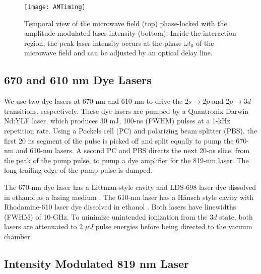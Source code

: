 \documentclass[aps,pra,reprint,groupedaddress]{revtex4-1}
\begin{document}
\begin{figure}
	\texttt{[image: AMTiming]}
	\caption{Temporal view of the microwave field (top) phase-locked with the amplitude modulated laser intensity (bottom). Inside the interaction region, the peak laser intensity occurs at the phase $\omega t_0$ of the microwave field and can be adjusted by an optical delay line.}
	\label{fig:AMLaser}
\end{figure}

\subsection{\label{sec:dye} 670 and 610 nm Dye Lasers}

We use two dye lasers at 670-nm and 610-nm to drive the $2s \rightarrow 2p$ and $2p \rightarrow 3d$ transitions, respectively. These dye lasers are pumped by a Quantronix Darwin Nd:YLF laser, which produces 30 mJ, 100-ns (FWHM) pulses at a 1-kHz repetition rate. Using a Pockels cell (PC) and polarizing beam splitter (PBS), the first 20 ns segment of the pulse is picked off and split equally to pump the 670-nm and 610-nm lasers. A second PC and PBS directs the next 20-ns slice, from the peak of the pump pulse, to pump a dye amplifier for the 819-nm laser. The long trailing edge of the pump pulse is dumped.

The 670-nm dye laser has a Littman-style cavity and LDS-698 laser dye dissolved in ethanol as a lasing medium \cite{Littman}. The 610-nm laser has a H{\"a}nsch style cavity with Rhodamine-610 laser dye dissolved in ethanol \cite{Hansch}. Both lasers have linewidths (FWHM) of 10-GHz. To minimize unintended ionization from the $3d$ state, both lasers are attenuated to 2 $\mu J$ pulse energies before being directed to the vacuum chamber.

\subsection{\label{sec:ampmod} Intensity Modulated 819 nm Laser}
\end{document}
